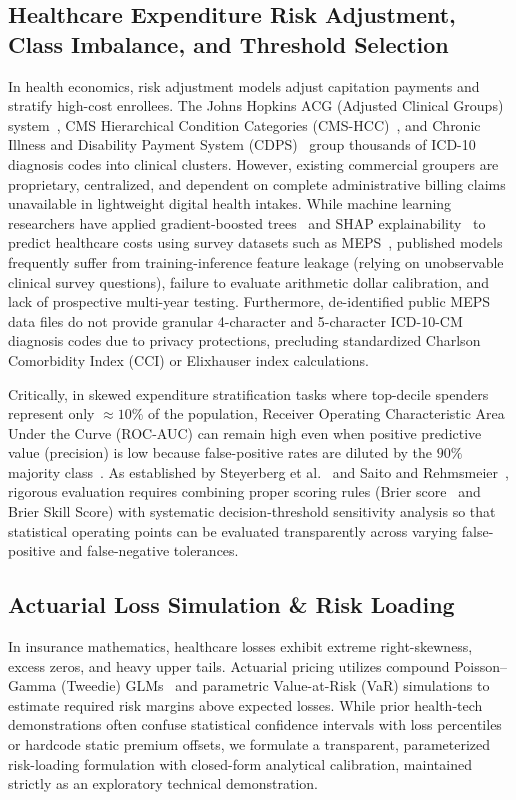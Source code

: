 \documentclass[runningheads]{llncs}
\begin{document}
\subsection{Healthcare Expenditure Risk Adjustment, Class Imbalance, and Threshold Selection}
In health economics, risk adjustment models adjust capitation payments and stratify high-cost enrollees. The Johns Hopkins ACG (Adjusted Clinical Groups) system~\cite{weiner1991development}, CMS Hierarchical Condition Categories (CMS-HCC)~\cite{cms2024report,pope2004risk}, and Chronic Illness and Disability Payment System (CDPS)~\cite{kronick2000improving} group thousands of ICD-10 diagnosis codes into clinical clusters. However, existing commercial groupers are proprietary, centralized, and dependent on complete administrative billing claims unavailable in lightweight digital health intakes. While machine learning researchers have applied gradient-boosted trees~\cite{chen2016xgboost} and SHAP explainability~\cite{lundberg2017unified} to predict healthcare costs using survey datasets such as MEPS~\cite{ahrq_meps_2023}, published models frequently suffer from training-inference feature leakage (relying on unobservable clinical survey questions), failure to evaluate arithmetic dollar calibration, and lack of prospective multi-year testing. Furthermore, de-identified public MEPS data files do not provide granular 4-character and 5-character ICD-10-CM diagnosis codes due to privacy protections, precluding standardized Charlson Comorbidity Index (CCI) or Elixhauser index calculations.

Critically, in skewed expenditure stratification tasks where top-decile spenders represent only $\approx 10\%$ of the population, Receiver Operating Characteristic Area Under the Curve (ROC-AUC) can remain high even when positive predictive value (precision) is low because false-positive rates are diluted by the $90\%$ majority class~\cite{davis2006relationship,saito2015precision}. As established by Steyerberg et al.~\cite{steyerberg2010assessing} and Saito and Rehmsmeier~\cite{saito2015precision}, rigorous evaluation requires combining proper scoring rules (Brier score~\cite{brier1950verification} and Brier Skill Score) with systematic decision-threshold sensitivity analysis so that statistical operating points can be evaluated transparently across varying false-positive and false-negative tolerances.

\subsection{Actuarial Loss Simulation \& Risk Loading}
In insurance mathematics, healthcare losses exhibit extreme right-skewness, excess zeros, and heavy upper tails. Actuarial pricing utilizes compound Poisson--Gamma (Tweedie) GLMs~\cite{tweedie1984index,jorgensen1987exponential} and parametric Value-at-Risk (VaR) simulations to estimate required risk margins above expected losses. While prior health-tech demonstrations often confuse statistical confidence intervals with loss percentiles or hardcode static premium offsets, we formulate a transparent, parameterized risk-loading formulation with closed-form analytical calibration, maintained strictly as an exploratory technical demonstration.
\end{document}
